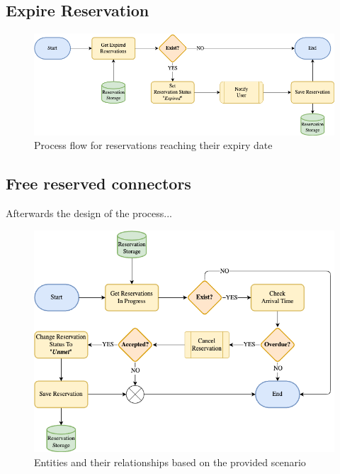 \subsection{Expire Reservation}
\label{ch:Design:sec:Use Cases:ssec:Expire Reservation}

\begin{figure}[!ht]
    \centering
    \includegraphics[scale=0.4]{resources/images/main/5_design/processes/scheduler/UpdateExpiredReservations.png}
    \caption{Process flow for reservations reaching their expiry date}
    \label{fig:expire-reservation-flowchart}
\end{figure}

\subsection{Free reserved connectors}
\label{ch:Design:sec:Use Cases:ssec:Free reserved connectors}

Afterwards the design of the process...

\begin{figure}[!ht]
    \centering
    \includegraphics[scale=0.4]{resources/images/main/5_design/processes/scheduler/CancelUnmetReservation.png}
    \caption{Entities and their relationships based on the provided scenario}
    \label{fig:free-connector-flowchart}
\end{figure}

